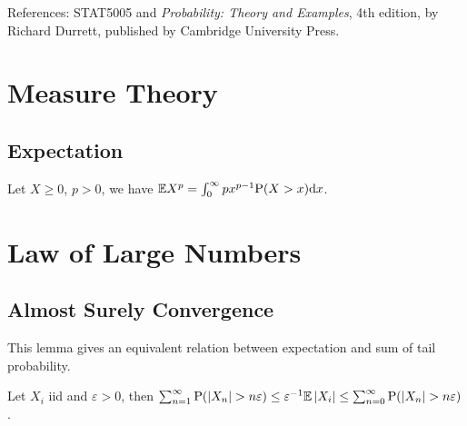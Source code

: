 \documentclass[10pt,a4paper]{article}
\begin{document}
	\MakeScribeTop
	\tableofcontents


References: STAT5005 and \textit{Probability: Theory and Examples}, 4th edition, by Richard Durrett, published by Cambridge University Press.

\section{Measure Theory}\label{sec:measure}

\subsection{Expectation}\label{sec:measure-expectation}
\begin{lemma}\label{lamma:measure-expectation-expInt}
	Let $X\geq 0$, $p>0$, we have $\mathbb E X^p=\int_{0}^{\infty }px^{p-1}\mathrm{P}(X>x) \mathrm{d} x$.
\end{lemma}


\section{Law of Large Numbers}\label{sec:LLN}




\subsection{Almost Surely Convergence}\label{sec:LLN-AS}

This lemma gives an equivalent relation between expectation and sum of tail probability.
\begin{lemma}\label{lemma:LLN-AS-expectation-sumTail}
	Let $X_i$ iid and $\varepsilon>0$, then $\sum_{n=1}^{\infty } \mathrm{P}(\left\lvert X_n\right\rvert>n\varepsilon) \leq \varepsilon^{-1}\mathbb E\left\lvert X_i\right\rvert \leq  \sum_{n=0}^\infty \mathrm{P}(\left\lvert X_n\right\rvert>n\varepsilon)$.  
\end{lemma}





\end{document}
